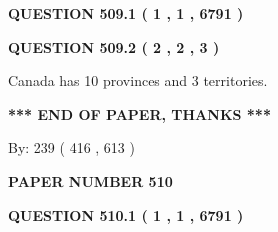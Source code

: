 \documentclass[12pt]{article}
\begin{document}
   
 \vspace{0.2in}
 
 
 
 
   
   
  
\vspace{0.2in}
  
{\textbf{\Large{QUESTION
509.1 
 ( 1 , 1 , 6791 )
}}}
  
  
  
\vspace{0.2in}
  
{\textbf{\Large{QUESTION
509.2 
 ( 2 , 2 , 3 )
}}}
  
  
 
 
\noindent{}
 
 
Canada has 10  provinces and 3 territories.
 
 
 
 
   
   
 \vspace{0.2in}
 
   
   
   
   
\vspace{1.0in} 
{\textbf{\large{ *** END OF PAPER, THANKS *** }}} 
   
   
\hspace{1.0in} By: 
 239 ( 416 ,  613 )
   
   
   
   
\newpage 
\setcounter{page}{ 
   510001 } 
   
   
   
   
 {\textbf{ \Large{ PAPER NUMBER  510  }}}
   
   
\vspace{0.2in}
   
   
   
   
   
   
 \vspace{0.2in}
 
 
 
 
   
   
  
\vspace{0.2in}
  
{\textbf{\Large{QUESTION
510.1 
 ( 1 , 1 , 6791 )
}}}
  
  
  
\end{document}
